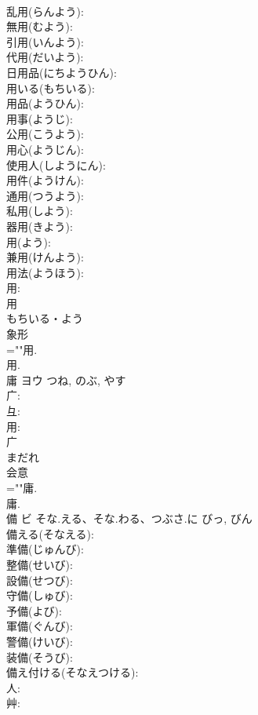 \documentclass[8pt]{extreport}
\begin{document}
\begin{CJK}{UTF8}{min}
\\	乱用(らんよう): 
\\	無用(むよう): 
\\	引用(いんよう): 
\\	代用(だいよう): 
\\	日用品(にちようひん): 
\\	用いる(もちいる): 
\\	用品(ようひん): 
\\	用事(ようじ): 
\\	公用(こうよう): 
\\	用心(ようじん): 
\\	使用人(しようにん): 
\\	用件(ようけん): 
\\	通用(つうよう): 
\\	私用(しよう): 
\\	器用(きよう): 
\\	用(よう): 
\\	兼用(けんよう): 
\\	用法(ようほう): 
\\	用: 
\\	用	
\\	もちいる・よう	
\\	象形 
\\	=""用.
\\	用.
\\	庸	ヨウ		つね, のぶ, やす	
\\	广: 
\\	彑: 
\\	用: 
\\	广	
\\	まだれ	
\\	会意 
\\	=""庸.
\\	庸.
\\	備	ビ	そな.える、そな.わる、つぶさ.に	びっ, びん	
\\	備える(そなえる): 
\\	準備(じゅんび): 
\\	整備(せいび): 
\\	設備(せつび): 
\\	守備(しゅび): 
\\	予備(よび): 
\\	軍備(ぐんび): 
\\	警備(けいび): 
\\	装備(そうび): 
\\	備え付ける(そなえつける): 
\\	人: 
\\	艸: 

\end{CJK}
\end{document}
